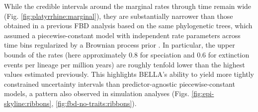 While the credible intervals around the marginal rates through time remain wide (Fig. \ref{fig:platyrrhine:marginal}), they are substantially narrower than those obtained in a previous FBD analysis based on the same phylogenetic trees, which assumed a piecewise-constant model with independent rate parameters across time bins regularized by a Brownian process prior \citep{silvestro2019early}.
In particular, the upper bounds of the rates (here approximately 0.8 for speciation and 0.6 for extinction events per lineage per million years) are roughly tenfold lower than the highest values estimated previously.
This highlights BELLA’s ability to yield more tightly constrained uncertainty intervals than predictor-agnostic piecewise-constant models, a pattern also observed in simulation analyses (Figs. \ref{fig:epi-skyline:ribbons}, \ref{fig:fbd-no-traits:ribbons}).